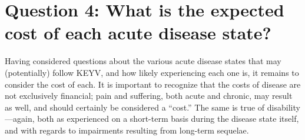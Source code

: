 \documentclass[12pt]{article}
\begin{document}
    \section[Expected costs, given diseases]{Question 4: What is the expected cost of each acute disease state?}
        \label{costs}
        Having considered questions about the various acute disease states that may (potentially) follow KEYV, and how likely experiencing each one is, it remains to consider the cost of each. It is important to recognize that the costs of disease are not exclusively financial; pain and suffering, both acute and chronic, may result as well, and should certainly be considered a ``cost.'' The same is true of disability---again, both as experienced on a short-term basis during the disease state itself, and with regards to impairments resulting from long-term sequelae.

        

\end{document}
